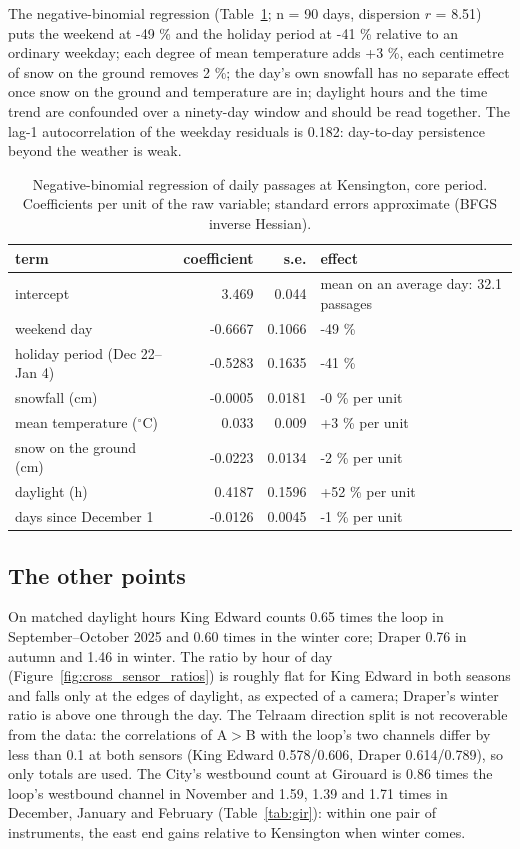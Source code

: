 \documentclass[11pt,a4paper]{article}
\begin{document}
The negative-binomial regression (Table~\ref{tab:nb}; n = 90 days, dispersion $r$ = 8.51) puts the weekend at -49 \% and the holiday period at -41 \% relative to an ordinary weekday; each degree of mean temperature adds +3 \%, each centimetre of snow on the ground removes 2 \%; the day\textquoteright{}s own snowfall has no separate effect once snow on the ground and temperature are in; daylight hours and the time trend are confounded over a ninety-day window and should be read together. The lag-1 autocorrelation of the weekday residuals is 0.182: day-to-day persistence beyond the weather is weak.
\begin{table}[htbp]\centering\small\caption{Negative-binomial regression of daily passages at Kensington, core period. Coefficients per unit of the raw variable; standard errors approximate (BFGS inverse Hessian).}\label{tab:nb}
\begin{tabular}{@{}lrrl@{}}\toprule term & coefficient & s.e. & effect\\ \midrule
intercept & 3.469 & 0.044 & mean on an average day: 32.1 passages \\
weekend day & -0.6667 & 0.1066 & -49 \% \\
holiday period (Dec 22--Jan 4) & -0.5283 & 0.1635 & -41 \% \\
snowfall (cm) & -0.0005 & 0.0181 & -0 \% per unit \\
mean temperature ($^\circ$C) & 0.033 & 0.009 & +3 \% per unit \\
snow on the ground (cm) & -0.0223 & 0.0134 & -2 \% per unit \\
daylight (h) & 0.4187 & 0.1596 & +52 \% per unit \\
days since December 1 & -0.0126 & 0.0045 & -1 \% per unit \\
\bottomrule\end{tabular}\end{table}

\subsection{The other points}
On matched daylight hours King Edward counts 0.65 times the loop in September--October 2025 and 0.60 times in the winter core; Draper 0.76 in autumn and 1.46 in winter. The ratio by hour of day (Figure~\ref{fig:cross_sensor_ratios}) is roughly flat for King Edward in both seasons and falls only at the edges of daylight, as expected of a camera; Draper\textquoteright{}s winter ratio is above one through the day. The Telraam direction split is not recoverable from the data: the correlations of A$>$B with the loop\textquoteright{}s two channels differ by less than 0.1 at both sensors (King Edward 0.578/0.606, Draper 0.614/0.789), so only totals are used. The City\textquoteright{}s westbound count at Girouard is 0.86 times the loop\textquoteright{}s westbound channel in November and 1.59, 1.39 and 1.71 times in December, January and February (Table~\ref{tab:gir}): within one pair of instruments, the east end gains relative to Kensington when winter comes.
\end{document}
